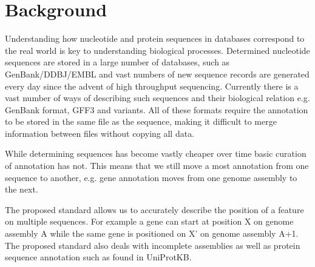 \section*{Background}
Understanding how nucleotide and protein sequences in databases correspond to the real world is key to understanding biological processes.
Determined nucleotide sequences are stored in a large number of databases, such as GenBank/DDBJ/EMBL and vast numbers of new sequence records are generated every day since the advent of high throughput sequencing. Currently there is a vast number of ways of describing such sequences and their biological relation e.g. GenBank format, GFF3 and variants. All of these formats require the annotation to be stored in the same file as the sequence, making it difficult to merge information between files without copying all data.

While determining sequences has become vastly cheaper over time basic curation of annotation has not. This means that we still move a most annotation from one sequence to another, e.g. gene annotation moves from one genome assembly to the next.

The proposed standard allows us to accurately describe the position of a feature on multiple sequences. For example a gene can start at position X on genome assembly A while the same gene is positioned on X' on genome assembly A+1. The proposed standard also deals with incomplete assemblies as well as protein sequence annotation such as found in UniProtKB.
